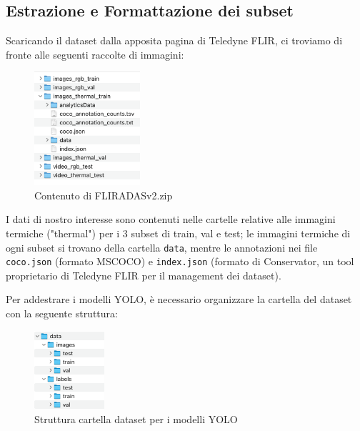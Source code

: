 \subsection{Estrazione e Formattazione dei subset}
Scaricando il dataset dalla apposita pagina di Teledyne FLIR\cite{39}, ci troviamo di fronte alle seguenti raccolte di immagini:

\begin{figure}[ht]
    \centering
    \includegraphics[width=0.35\textwidth]{files/capitoli/4-sperimentazione-risultati/assets/flir-adas.png}
    \caption{\label{fig:flir-adas}Contenuto di FLIR\textunderscore ADAS\textunderscore v2.zip}
\end{figure}

I dati di nostro interesse sono contenuti nelle cartelle relative alle immagini termiche ("thermal") per i 3 subset di train, val e test; le immagini termiche di ogni subset si trovano della cartella \texttt{data}, mentre le annotazioni nei file \texttt{coco.json} (formato MSCOCO) e \texttt{index.json} (formato di Conservator, un tool proprietario di Teledyne FLIR per il management dei dataset).

\newpage

Per addestrare i modelli YOLO, è necessario organizzare la cartella del dataset con la seguente struttura:

\begin{figure}[ht]
    \centering
    \includegraphics[width=0.23\textwidth]{files/capitoli/4-sperimentazione-risultati/assets/yolo-data-format.png}
    \caption{\label{fig:yolo-data-format}Struttura cartella dataset per i modelli YOLO}
\end{figure}

